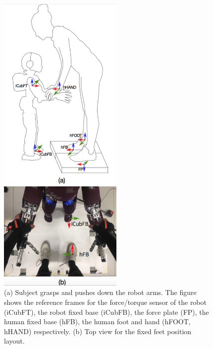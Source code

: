 \begin{figure}[ht]
  \centering
    \includegraphics[width=6cm]{figs/interaction_lateralAndTop}
          \caption{(a)  Subject grasps and pushes down the robot arms.  The figure shows the
		  reference frames for the force/torque sensor of the robot (iCubFT), the robot fixed
		   base (iCubFB), the force plate (FP), the human fixed base (hFB), the human foot and
		    hand (hFOOT, hHAND) respectively. (b) Top view for the fixed feet position layout.}
			\label{fig:interaction_lateral&top}
\end{figure}
%

